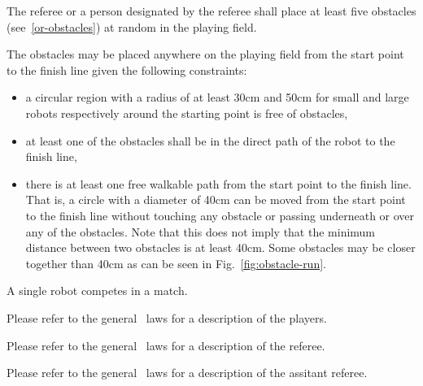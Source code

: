 \documentclass[12pt]{hurocup}
\begin{document}
\begin{lawlist}[OR]
\item The referee or a person designated by the referee shall place
  at least five obstacles (see~\ref{or-obstacles}) at random in the
  playing field.

\item \label{obs-place1} The obstacles may be placed anywhere on the
  playing field from the start point to the finish line given the
  following constraints:

  \begin{itemize} 
  \item a circular region with a radius of at least 30cm and 50cm
    for small and large robots respectively around the starting
    point is free of obstacles,
  \item at least one of the obstacles shall be in the direct path of the
    robot to the finish line,
  \item there is at least one free walkable path from the start point to the
    finish line. That is, a circle with a diameter of 40cm can be moved
    from the start point to the finish line without touching any
    obstacle or passing underneath or over any of the obstacles. Note
    that this does not imply that the minimum distance between two
    obstacles is at least 40cm. Some obstacles may be closer together than
    40cm as can be seen in Fig.~\ref{fig:obstacle-run}. 
  \end{itemize}
\end{lawlist}


\begin{lawlist}[OR]
\item A single robot competes in a match.
\end{lawlist}


Please refer to the general \HuroCup\ laws for a description of
the players.


Please refer to the general \HuroCup\ laws for a description of
the referee.


Please refer to the general \HuroCup\ laws for a description of
the assitant referee.

\end{document}
